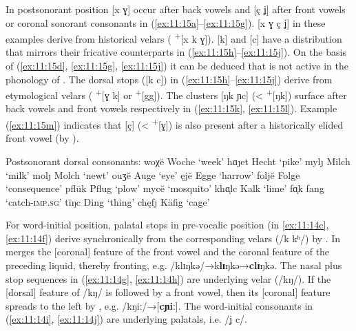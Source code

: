 In postsonorant position [x ɣ] occur after back vowels and [ç ʝ] after front vowels or coronal sonorant consonants in (\ref{ex:11:15a}--\ref{ex:11:15g}). [x ɣ ç ʝ] in these examples derive from historical velars ( \textsuperscript{+}[x k ɣ]). [k] and [c] have a distribution that mirrors their fricative counterparts in (\ref{ex:11:15h}--\ref{ex:11:15j}). On the basis of (\ref{ex:11:15d}, \ref{ex:11:15g}, \ref{ex:11:15j}) it can be deduced that  is not active in the phonology of . The dorsal stops ([k c]) in (\ref{ex:11:15h}--\ref{ex:11:15j}) derive from etymological velars ( \textsuperscript{+}[ɣ k] or \textsuperscript{+}[gg]). The clusters [ŋk ɲc] (< \textsuperscript{+}[ŋk]) surface after back vowels and front vowels respectively in (\ref{ex:11:15k}, \ref{ex:11:15l}). Example (\ref{ex:11:15m}) indicates that [ç] (< \textsuperscript{+}[ɣ]) is also present after a historically elided front vowel (by ).

\ea%
\label{ex:11:15}Postsonorant dorsal consonants:
\ea\label{ex:11:15a} woχĕ \tab [vɔxə] \tab  Woche \tab ‘week’ 
\ex\label{ex:11:15b} hɑȷet \tab  [hæçt] \tab  Hecht \tab ‘pike’ 
\ex\label{ex:11:15c} mylȷ \tab  [mʏlç] \tab  Milch \tab ‘milk’ 
\ex\label{ex:11:15d} molȷ \tab [mɔlç] \tab Molch \tab ‘newt’ 
\ex\label{ex:11:15e} ouʒĕ \tab [ouɣə] \tab Auge \tab ‘eye’ 
\ex\label{ex:11:15f} ęjĕ \tab [ɛʝə] \tab Egge \tab ‘harrow’ 
\ex\label{ex:11:15g} foljĕ \tab [fɔlʝə] \tab Folge \tab ‘consequence’ 
\ex\label{ex:11:15h} pflūk \tab [pfluːk] \tab  Pflug \tab ‘plow’ 
\ex\label{ex:11:15i} mycĕ \tab [mʏcə] \tab  {} \tab ‘mosquito’ 
\ex\label{ex:11:15j} khɑͅlc  \tab Kalk \tab ‘lime’ 
\ex\label{ex:11:15k} fɑͅk \tab [fɑŋk] \tab fang \tab ‘catch\textsc{{}-imp.sg}’ 
\ex\label{ex:11:15l} tiŋc \tab [tɪɲc] \tab Ding \tab ‘thing’ 
\ex\label{ex:11:15m} chęfȷ  \tab  Käfig \tab ‘cage’ 
\z 
\z{}

For word-initial position, palatal stops in pre-vocalic position (in \ref{ex:11:14c}, \ref{ex:11:14f}) derive synchronically from the corresponding velars (/k kʰ/) by . In   merges the [coronal] feature of the front vowel and the coronal feature of the preceding liquid, thereby  fronting, e.g. /klɪŋkə/→{\textbar}k\textbf{lɪ}ŋkə{\textbar}→{\textbar}\textbf{clɪ}ŋkə{\textbar}. The nasal plus stop sequences in (\ref{ex:11:14g}, \ref{ex:11:14h}) are underlying velar (/kŋ/). If the [dorsal] feature of /kŋ/ is followed by a front vowel, then its [coronal] feature spreads to the left by , e.g. /kŋiː/→[\textbf{cɲiː}]. The word-initial consonants in (\ref{ex:11:14i}, \ref{ex:11:14j}) are underlying palatals, i.e. /ʝ c/.

